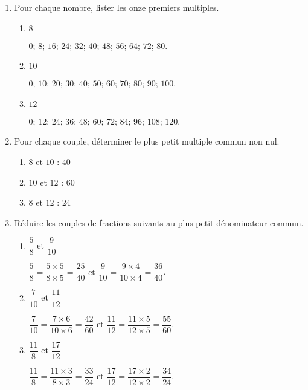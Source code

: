\begin{corrige}
    \begin{enumerate}
        \item Pour chaque nombre, lister les onze premiers multiples.
        
            \begin{enumerate}
                \item $8$  
                
                {\red $0$; $8$;  $16$; $24$; $32$; $40$; $48$; $56$; $64$; $72$; $80$.}
                \item $10$ 
                
                {\red $0$; $10$; $20$; $30$; $40$; $50$; $60$; $70$; $80$; $90$; $100$.}
                \item $12$ 
                
                {\red $0$; $12$; $24$; $36$; $48$; $60$; $72$; $84$; $96$; $108$; $120$.}
            \end{enumerate}  
        \setcounter{enumi}{1}
        \item Pour chaque couple, déterminer le plus petit multiple commun non nul.

            \begin{enumerate}
                \item $8$ et $10$  {\red : $40$}
                \item $10$ et $12$ {\red : $60$}
                \item $8$ et $12$  {\red : $24$}
            \end{enumerate}           
        \setcounter{enumi}{2}
        \item Réduire les couples de fractions suivants au plus petit dénominateur commun.
        
            \begin{spacing}{2}
                \begin{enumerate}
                    \item $\dfrac{5}{8}$ et $\dfrac{9}{10}$   
                    
                    {\red $\dfrac{5}{8}=\dfrac{5\times5}{8\times5}=\dfrac{25}{40}$ et $\dfrac{9}{10}=\dfrac{9\times4}{10\times4}=\dfrac{36}{40}$}.
                    \item $\dfrac{7}{10}$ et $\dfrac{11}{12}$ 
                    
                    {\red $\dfrac{7}{10}=\dfrac{7\times6}{10\times6}=\dfrac{42}{60}$ et $\dfrac{11}{12}=\dfrac{11\times5}{12\times5}=\dfrac{55}{60}$}.
                    \item $\dfrac{11}{8}$ et $\dfrac{17}{12}$ 
                    
                    {\red $\dfrac{11}{8}=\dfrac{11\times3}{8\times3}=\dfrac{33}{24}$ et $\dfrac{17}{12}=\dfrac{17\times2}{12\times2}=\dfrac{34}{24}$}.
                \end{enumerate}
            \end{spacing}
    \end{enumerate}
\end{corrige}

